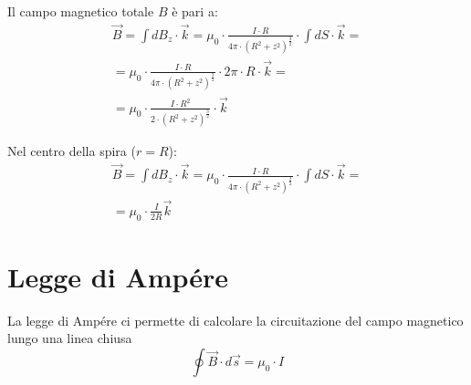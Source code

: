 Il campo magnetico totale $B$ è pari a:
\begin{displaymath}\begin{aligned}
	\vec{B} = \int dB_z \cdot \vec{k} =  \mu_0 \cdot \frac{I \cdot R}{4\pi \cdot (R^2 + z^2)^\frac{3}{2}} \cdot \int dS \cdot \vec{k} = \\
    = \mu_0 \cdot \frac{I \cdot R}{4\pi \cdot (R^2 + z^2)^\frac{3}{2}} \cdot 2 \pi \cdot R \cdot \vec{k} = \\
    =\mu_0 \cdot \frac{I \cdot R^2}{2 \cdot (R^2 + z^2)^\frac{3}{2}} \cdot \vec{k}
\end{aligned}\end{displaymath}

Nel centro della spira ($r=R$):
\begin{displaymath}\begin{aligned}
	\vec{B} = \int dB_z \cdot \vec{k} =  \mu_0 \cdot \frac{I \cdot R}{4\pi \cdot (R^2 + z^2)^\frac{3}{2}} \cdot \int dS \cdot \vec{k} = \\
    = \mu_0 \cdot \frac{I}{2R} \vec{k}
\end{aligned}\end{displaymath}

\section{Legge di Ampére}
La legge di Ampére ci permette di calcolare la circuitazione del campo magnetico lungo una linea chiusa
\begin{displaymath}
	\oint \vec{B} \cdot d\vec{s} = \mu_0 \cdot I
\end{displaymath}

